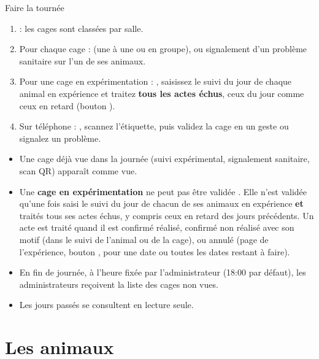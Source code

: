 \documentclass[11pt,a4paper]{article}
\begin{document}
\begin{procedure}{Faire la tournée}
\begin{enumerate}
  \item {} : les cages sont classées par
    salle.
  \item Pour chaque cage :  (une à une ou en groupe), ou
    signalement d'un problème sanitaire sur l'un de ses animaux.
  \item Pour une cage en expérimentation : ,
    saisissez le suivi du jour de chaque animal en expérience et traitez
    \textbf{tous les actes échus}, ceux du jour comme ceux en retard
    (bouton ).
  \item Sur téléphone : , scannez
    l'étiquette, puis validez la cage en un geste ou signalez un problème.
\end{enumerate}
\end{procedure}

\begin{regle}
\begin{itemize}
  \item Une cage déjà vue dans la journée (suivi expérimental, signalement
    sanitaire, scan QR) apparaît comme vue.
  \item Une \textbf{cage en expérimentation} ne peut pas être validée
    . Elle n'est validée qu'une fois saisi le suivi du jour de
    chacun de ses animaux en expérience \textbf{et} traités tous ses actes
    échus, y compris ceux en retard des jours précédents. Un acte est traité
    quand il est confirmé réalisé, confirmé non réalisé avec son motif (dans
    le suivi de l'animal ou de la cage), ou annulé (page  de
    l'expérience, bouton , pour une date ou toutes les dates
    restant à faire).
  \item En fin de journée, à l'heure fixée par l'administrateur (18:00 par
    défaut), les administrateurs reçoivent la liste des cages non vues.
  \item Les jours passés se consultent en lecture seule.
\end{itemize}
\end{regle}

\section{Les animaux}
\end{document}
